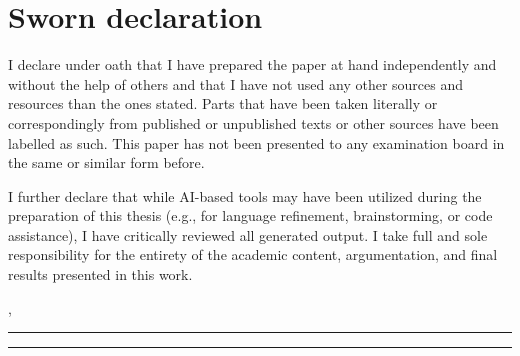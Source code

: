 \chapter*{Sworn declaration}

\pagestyle{plain}

I declare under oath that I have prepared the paper at hand independently and without the help of others and that I have not used any other sources and resources than the ones stated. Parts that have been taken literally or correspondingly from published or unpublished texts or other sources have been labelled as such. This paper has not been presented to any examination board in the same or similar form before.

I further declare that while AI-based tools may have been utilized during the preparation of this thesis (e.g., for language refinement, brainstorming, or code assistance), I have critically reviewed all generated output. I take full and sole responsibility for the entirety of the academic content, argumentation, and final results presented in this work.
\vfill

\vspace*{\baselineskip}
\noindent \begin{minipage}{\textwidth}
	\noindent \begin{minipage}{0.49\textwidth}
		\begin{flushleft}
			, \rule{3cm}{0.5pt}
		\end{flushleft}
	\end{minipage} \hfill
	\begin{minipage}{0.49\textwidth}
		\begin{flushright}
			\rule{4cm}{0.5pt}
		\end{flushright}
	\end{minipage}
\end{minipage}

\newpage